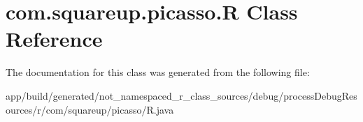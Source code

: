 \hypertarget{classcom_1_1squareup_1_1picasso_1_1_r}{}\section{com.\+squareup.\+picasso.\+R Class Reference}
\label{classcom_1_1squareup_1_1picasso_1_1_r}


The documentation for this class was generated from the following file\+:\begin{DoxyCompactItemize}
\item 
app/build/generated/not\+\_\+namespaced\+\_\+r\+\_\+class\+\_\+sources/debug/process\+Debug\+Resources/r/com/squareup/picasso/R.\+java\end{DoxyCompactItemize}
